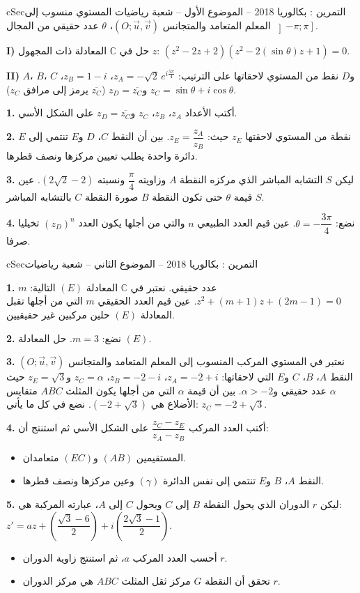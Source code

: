 \documentclass[12pt,a4paper]{article}
\newenvironment{BOX}[2]{\begin{otherlanguage}{english}\begin{arbox}{#1}{#2}}{\end{arbox}\end{otherlanguage}}
\newcounter{exo}
\newenvironment{tamrin}[1]{\stepcounter{exo}\begin{BOX}{cSec}{التمرين \theexo: #1}}{\end{BOX}}
\newenvironment{sq}{\begin{itemize}[leftmargin=2.4em,itemsep=3pt]}{\end{itemize}}
\newcommand{\qa}{\item[(أ)]}\newcommand{\qb}{\item[(ب)]}\newcommand{\qc}{\item[(جـ)]}\newcommand{\qd}{\item[(د)]}\newcommand{\qe}{\item[(هـ)]}
\newcommand{\QQ}[1]{\par\smallskip\textbf{#1.} }
\begin{document}
\begin{tamrin}{بكالوريا 2018 -- الموضوع الأول -- شعبة رياضيات}
المستوي منسوب إلى المعلم المتعامد والمتجانس $\left(O;\vec u,\vec v\right)$، $\theta$ عدد حقيقي من المجال $\left]-\pi;\pi\right]$.

\textbf{I)} حل في $\mathbb{C}$ المعادلة ذات المجهول $z$: $\left(z^2-2z+2\right)\left(z^2-2(\sin\theta)z+1\right)=0$.

\textbf{II)} $A$، $B$، $C$ و$D$ نقط من المستوي لاحقاتها على الترتيب:
$z_A=-\sqrt2\,e^{i\frac{5\pi}{4}}$، $z_B=1-i$، $z_C=\sin\theta+i\cos\theta$ و$z_D=\overline{z_C}$ ($\overline{z_C}$ يرمز إلى مرافق $z_C$).

\QQ{1} أكتب الأعداد $z_A$، $z_B$، $z_C$ و$z_D=\overline{z_C}$ على الشكل الأسي.

\QQ{2} $E$ نقطة من المستوي لاحقتها $z_E$ حيث: $z_E=\dfrac{z_A}{z_B}$. بين أن النقط $C$، $D$ و$E$ تنتمي إلى دائرة واحدة يطلب تعيين مركزها ونصف قطرها.

\QQ{3} ليكن $S$ التشابه المباشر الذي مركزه النقطة $A$ وزاويته $\dfrac{\pi}{4}$ ونسبته $\left(2\sqrt2-2\right)$.
عين قيمة $\theta$ حتى تكون النقطة $B$ صورة النقطة $C$ بالتشابه المباشر $S$.

\QQ{4} نضع: $\theta=-\dfrac{3\pi}{4}$. عين قيم العدد الطبيعي $n$ والتي من أجلها يكون العدد $\left(z_D\right)^n$ تخيليا صرفا.
\end{tamrin}

\begin{tamrin}{بكالوريا 2018 -- الموضوع الثاني -- شعبة رياضيات}
\QQ{1} $m$ عدد حقيقي. نعتبر في $\mathbb{C}$ المعادلة $(E)$ التالية: $z^2+(m+1)z+(2m-1)=0$.
عين قيم العدد الحقيقي $m$ التي من أجلها تقبل المعادلة $(E)$ حلين مركبين غير حقيقيين.

\QQ{2} نضع: $m=3$. حل المعادلة $(E)$.

\QQ{3} نعتبر في المستوي المركب المنسوب إلى المعلم المتعامد والمتجانس $\left(O;\vec u,\vec v\right)$ النقط $A$، $B$، $C$ و$E$ التي لاحقاتها:
$z_A=-2+i$، $z_B=-2-i$، $z_C=\alpha$ و$z_E=\sqrt3$ حيث $\alpha$ عدد حقيقي و$\alpha>-2$.
بين أن قيمة $\alpha$ التي من أجلها يكون المثلث $ABC$ متقايس الأضلاع هي $\left(-2+\sqrt3\right)$.
نضع في كل ما يأتي: $z_C=-2+\sqrt3$.

\QQ{4} أكتب العدد المركب $\dfrac{z_C-z_E}{z_A-z_B}$ على الشكل الأسي ثم استنتج أن:
\begin{sq}
\qa المستقيمين $(AB)$ و$(EC)$ متعامدان.
\qb النقط $A$، $B$ و$E$ تنتمي إلى نفس الدائرة $(\gamma)$ وعين مركزها ونصف قطرها.
\end{sq}
\QQ{5} ليكن $r$ الدوران الذي يحول النقطة $B$ إلى $C$ ويحول $C$ إلى $A$، عبارته المركبة هي:
$z'=az+\left(\dfrac{\sqrt3-6}{2}\right)+i\left(\dfrac{2\sqrt3-1}{2}\right)$.
\begin{sq}
\qa أحسب العدد المركب $a$، ثم استنتج زاوية الدوران $r$.
\qb تحقق أن النقطة $G$ مركز ثقل المثلث $ABC$ هي مركز الدوران $r$.
\end{sq}
\end{tamrin}
\end{document}
